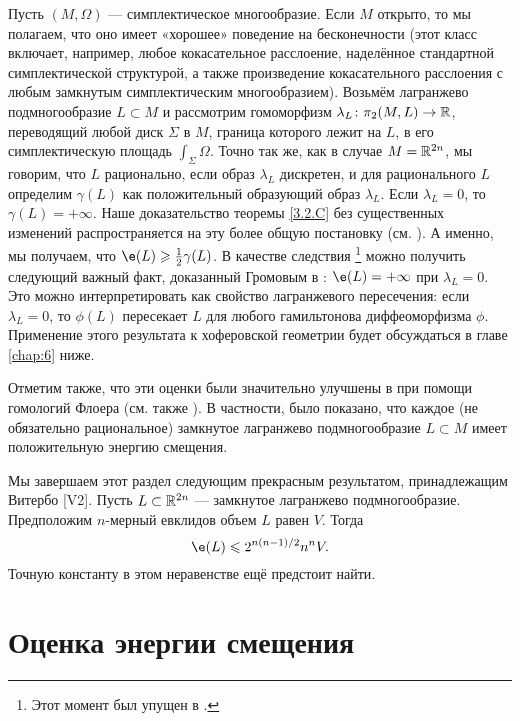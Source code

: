\begin{thm}{}\label{3.2.G}
\end{thm}

Пусть $(M, \Omega)$ --- симплектическое многообразие.
Если $M$ открыто, то мы полагаем, что оно имеет «хорошее» поведение на бесконечности (этот класс включает, например, любое кокасательное расслоение, наделённое стандартной симплектической структурой, а также произведение кокасательного расслоения с любым замкнутым симплектическим многообразием).
Возьмём лагранжево подмногообразие $L \subset M$ и рассмотрим гомоморфизм $\lambda_L\colon \pi_2 (M, L) \to \mathbb{R}$, переводящий любой диск $\Sigma$ в $M$, граница которого лежит на $L$, в его симплектическую площадь $\int_\Sigma \Omega$.
Точно так же, как в случае $M = \mathbb{R}^{2n}$, мы говорим, что $L$ рационально, если образ $\lambda_L$ дискретен, и для рационального $L$ определим $\gamma (L)$ как положительный образующий образ $\lambda_L$.
Если $\lambda_L = 0$, то  $\gamma (L) = + \infty$.
Наше доказательство теоремы \ref{3.2.C} без существенных изменений распространяется на эту более общую постановку (см. \cite{P1}).
А именно, мы получаем, что $\e (L) \ge \tfrac12 \gamma (L)$.
В качестве следствия%
\footnote{Этот момент был упущен в \cite[с. 359]{P1}.}
можно получить следующий важный факт, доказанный Громовым в \cite{G1}: $\e (L) = + \infty$ при $\lambda_L = 0$.
Это можно интерпретировать как свойство лагранжевого пересечения: если $\lambda_L = 0$, то $\phi (L)$ пересекает $L$ для любого гамильтонова диффеоморфизма $\phi$.
Применение этого результата к хоферовской геометрии будет обсуждаться в главе \ref{chap:6} ниже.

Отметим также, что эти оценки были значительно улучшены в \cite{Ch} при помощи гомологий Флоера (см. также \cite{O3}).
В частности, было показано, что каждое (не обязательно рациональное) замкнутое лагранжево подмногообразие $L \subset M$ имеет положительную энергию смещения.

\begin{thm}{}
\end{thm}

Мы завершаем этот раздел следующим прекрасным результатом, принадлежащим Витербо [V2].
Пусть $L \subset \mathbb{R}^{2n}$ --- замкнутое лагранжево подмногообразие.
Предположим $n$-мерный евклидов объем $L$ равен $V$.
Тогда 
\[\e (L) \le 2^{n(n-1)/2} n^n V.\]
Точную константу в этом неравенстве ещё предстоит найти. 

\section{Оценка энергии смещения}


